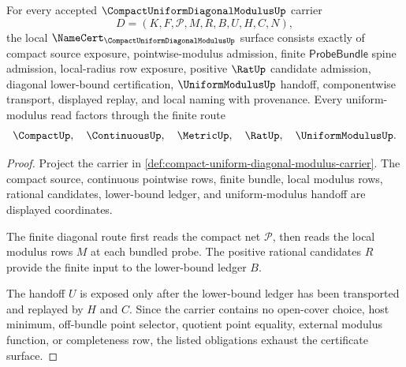 \begin{theorem}
\label{thm:compact-uniform-diagonal-modulus-namecert-obligations}
For every accepted $\CompactUniformDiagonalModulusUp$ carrier
$$
D=(K,F,\mathcal{P},M,R,B,U,H,C,N),
$$
the local $\NameCert_{\CompactUniformDiagonalModulusUp}$ surface consists exactly of compact source exposure, pointwise-modulus admission, finite $\mathsf{ProbeBundle}$ spine admission, local-radius row exposure, positive $\RatUp$ candidate admission, diagonal lower-bound certification, $\UniformModulusUp$ handoff, componentwise transport, displayed replay, and local naming with provenance. Every uniform-modulus read factors through the finite route
$$
\CompactUp,\quad \ContinuousUp,\quad \MetricUp,\quad \RatUp,\quad \UniformModulusUp .
$$
\end{theorem}
\begin{proof}
Project the carrier in \autoref{def:compact-uniform-diagonal-modulus-carrier}. The compact source, continuous pointwise rows, finite bundle, local modulus rows, rational candidates, lower-bound ledger, and uniform-modulus handoff are displayed coordinates.

The finite diagonal route first reads the compact net $\mathcal{P}$, then reads the local modulus rows $M$ at each bundled probe. The positive rational candidates $R$ provide the finite input to the lower-bound ledger $B$.

The handoff $U$ is exposed only after the lower-bound ledger has been transported and replayed by $H$ and $C$. Since the carrier contains no open-cover choice, host minimum, off-bundle point selector, quotient point equality, external modulus function, or completeness row, the listed obligations exhaust the certificate surface.
\end{proof}

